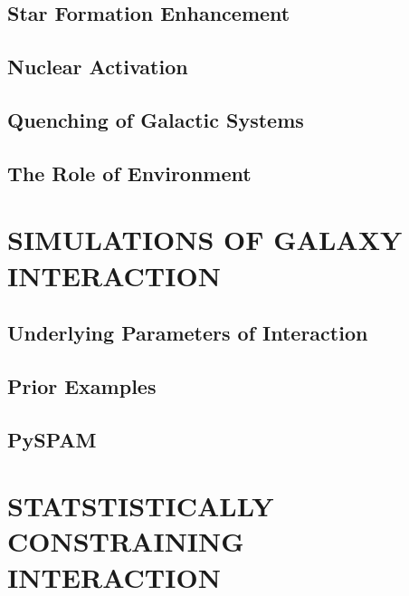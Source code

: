 


\subsection{Star Formation Enhancement} 
\subsection{Nuclear Activation}
\subsection{Quenching of Galactic Systems}
\subsection{The Role of Environment}

\section{SIMULATIONS OF GALAXY INTERACTION}

\subsection{Underlying Parameters of Interaction}

\subsection{Prior Examples}

\subsection{PySPAM}

\section{STATSTISTICALLY CONSTRAINING INTERACTION}

